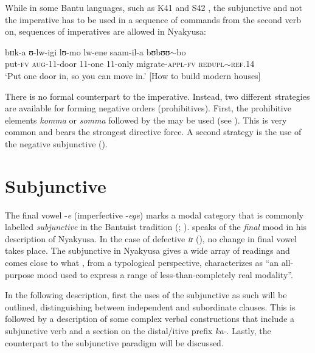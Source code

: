While in some Bantu languages, such as  K41 \citep{SeidelF2008} and  S42 \citep{ZiervogelDLouwJATaljaardP1981}, the subjunctive and not the imperative has to be used in a sequence of commands from the second verb on, sequences of imperatives are allowed in Nyakyusa:
\begin{exe}
\ex 
\gll bɪɪk-a ʊ-lw-igi lʊ-mo lw-ene saam-il-a bʊbʊʊ$\sim$bo\\
put-\textsc{fv} \textsc{aug}-11-door 11-one 11-only migrate-\textsc{appl}-\textsc{fv} \textsc{redupl}$\sim$\textsc{ref.14}\\
\glt `‎‎Put one door in, so you can move in.' [How to build modern houses]\label{exSeriesImperatives}
\end{exe}

There is no formal  counterpart to the imperative. Instead, two different strategies are available for forming negative orders (prohibitives). First, the prohibitive elements \textit{komma} or \textit{somma} followed by the  may be used (see ). This is very common and bears the strongest directive force. A second strategy is the use of the negative subjunctive ().
\section{Subjunctive}\label{Subjunctive} 
The final vowel -\textit{e} (imperfective -\textit{ege}) marks a modal category that is commonly labelled \textit{subjunctive} in the Bantuist tradition (\citealt[203f]{DokeC1935}; \citealt[83f]{RoseEtal2002}). \citet[62f]{EndemannC1914} speaks of the \textit{final} mood in his description of Nyakyusa. In the case of defective \textit{tɪ} (), no change in final vowel takes place. The subjunctive in Nyakyusa gives a wide array of readings and comes close to what \citet[326]{TimberlakeA2007}, from a typological perspective, characterizes as ``an all-purpose mood used to express a range of less-than-completely real modality''.

In the following description, first the uses of the subjunctive as such will be outlined, distinguishing between independent and subordinate clauses. This is followed by a description of some complex verbal constructions that include a subjunctive verb and a section on the distal/itive prefix \textit{ka}-. Lastly, the  counterpart to the subjunctive paradigm will be discussed. 
